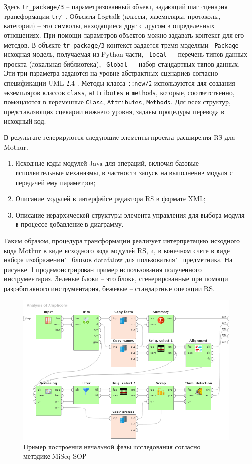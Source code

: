 \documentclass[12pt]{article}
\begin{document}
Здесь \texttt{tr\_package/3} -- параметризованный объект, задающий шаг сценария трансформации \texttt{tr/\_}.  Объекты Logtalk (классы, экземпляры, протоколы, категории) -- это символы, находящиеся друг с другом в определенных отношениях.  При помощи параметров объектов можно задавать контекст для его методов.  В объекте \texttt{tr\_package/3} контекст задается тремя моделями \texttt{\_Package\_} -- исходная модель, получаемая из Python-части, \texttt{\_Local\_} -- перечень типов данных проекта (локальная библиотека), \texttt{\_Global\_} -- набор стандартных типов данных.  Эти три параметра задаются на уровне абстрактных сценариев согласно спецификации UML-2.4 \cite{GT}. Методы класса \texttt{::new/2} используются для создания экземпляров классов \texttt{class}, \texttt{attributes} и \texttt{methods}, которые, соответственно, помещаются в переменные \texttt{Class}, \texttt{Attributes}, \texttt{Methods}.  Для всех структур, представляющих сценарии нижнего уровня, заданы процедуры перевода в исходный код.

В результате генерируются следующие элементы проекта расширения RS для Mothur.
\begin{enumerate}
\item Исходные коды модулей Java для операций, включая базовые исполнительные механизмы, в частности запуск на выполнение модуля с передачей ему параметров;
\item Описание модулей в интерфейсе редактора RS в формате XML;
\item Описание иерархической структуры элемента управления для выбора модуля в процессе добавление в диаграмму.
\end{enumerate}
Таким образом, процедура трансформации реализует интерпретацию исходного кода Mothur в виде исходного кода модулей RS, и, в конечном счете в виде набора изображений"=блоков datafalow для пользователя"=предметника.  На рисунке~\ref{fig:ex} продемонстрирован пример использования полученного инструментария.  Зеленые блоки --  это блоки, сгенерированные при помощи разработанного инструментария, бежевые -- стандартные операции RS.

\begin{figure}
  \centering
   \includegraphics[width=0.8\linewidth]{Dataflow-color-en.png}
  \caption{Пример построения начальной фазы исследования согласно методике MiSeq SOP}
  \label{fig:ex}
\end{figure}
\end{document}
